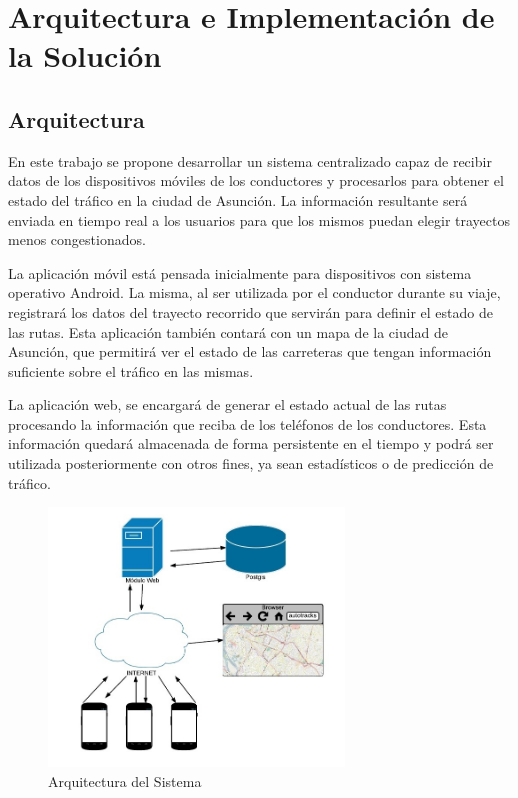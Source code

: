 \chapter{Arquitectura e Implementación de la Solución}

\section{Arquitectura}

En este trabajo se propone desarrollar un sistema centralizado capaz de recibir datos de los dispositivos móviles de los conductores y procesarlos para obtener el estado del tráfico en la ciudad de Asunción. La información resultante será enviada en tiempo real a los usuarios para que los mismos  puedan elegir trayectos menos congestionados.

La aplicación móvil está pensada inicialmente para dispositivos con sistema operativo Android. La misma, al ser utilizada por el conductor durante su viaje, registrará los datos del trayecto recorrido que servirán para definir el estado de las rutas. Esta aplicación también contará con un mapa de la ciudad de Asunción, que permitirá ver el estado de las carreteras que tengan información suficiente sobre el tráfico en las mismas. 

La aplicación web, se encargará de generar el estado actual de las rutas procesando la información que reciba de los teléfonos de los conductores. Esta información quedará almacenada de forma persistente en el tiempo  y podrá ser utilizada posteriormente con otros fines, ya sean estadísticos o de predicción de tráfico.

\begin{figure}[h]
	\centering
	\includegraphics[width=0.7\textwidth]{capitulos/6/figuras/figura1.jpg}
	\caption{\label{fig:arquitectura} Arquitectura del Sistema}	
\end{figure}

